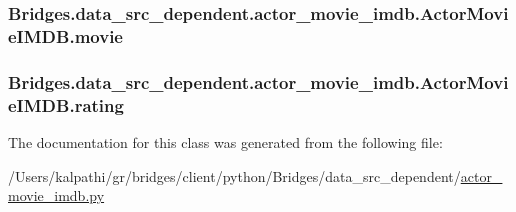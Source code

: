 \subsubsection[{movie}]{\setlength{\rightskip}{0pt plus 5cm}Bridges.\+data\+\_\+src\+\_\+dependent.\+actor\+\_\+movie\+\_\+imdb.\+Actor\+Movie\+I\+M\+D\+B.\+movie}\label{class_bridges_1_1data__src__dependent_1_1actor__movie__imdb_1_1_actor_movie_i_m_d_b_a5661f3355662942db75f5290215006b1}
\hypertarget{class_bridges_1_1data__src__dependent_1_1actor__movie__imdb_1_1_actor_movie_i_m_d_b_a1b8c314c6e30c9f7f342e476c0f8173a}{}
\subsubsection[{rating}]{\setlength{\rightskip}{0pt plus 5cm}Bridges.\+data\+\_\+src\+\_\+dependent.\+actor\+\_\+movie\+\_\+imdb.\+Actor\+Movie\+I\+M\+D\+B.\+rating}\label{class_bridges_1_1data__src__dependent_1_1actor__movie__imdb_1_1_actor_movie_i_m_d_b_a1b8c314c6e30c9f7f342e476c0f8173a}


The documentation for this class was generated from the following file\+:\begin{DoxyCompactItemize}
\item 
/\+Users/kalpathi/gr/bridges/client/python/\+Bridges/data\+\_\+src\+\_\+dependent/\hyperlink{actor__movie__imdb_8py}{actor\+\_\+movie\+\_\+imdb.\+py}\end{DoxyCompactItemize}
